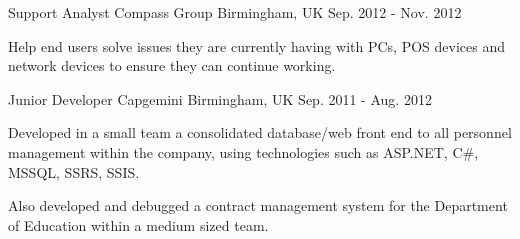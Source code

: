 \begin{cventries}
  \cventry
    {Support Analyst} %
    {Compass Group} %
    {Birmingham, UK} %
    {Sep. 2012 - Nov. 2012} %
    {
	    \begin{cvitems} %
	    \item {Help end users solve issues they are currently having with PCs, POS devices and network devices to ensure they can continue working.}
	    \end{cvitems}
    }

  \cventry
    {Junior Developer} %
    {Capgemini} %
    {Birmingham, UK} %
    {Sep. 2011 - Aug. 2012} %
    {
	    \begin{cvitems} %
	    \item {Developed in a small team a consolidated database/web front end to all personnel management within the company, using technologies such as ASP.NET, C\#, MSSQL, SSRS, SSIS.}
	    \item {Also developed and debugged a contract management system for the Department of Education within a medium sized team.}
	    \end{cvitems}
    }

\end{cventries}
